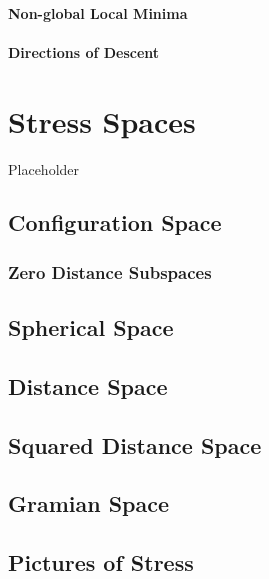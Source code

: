 \documentclass[
  12pt,
]{book}
\begin{document}
\subsubsection{Non-global Local Minima}\label{non-global-local-minima}

\subsubsection{Directions of Descent}\label{directions-of-descent}

\chapter{Stress Spaces}\label{propspaces}

Placeholder

\section{Configuration Space}\label{propconfspace}

\subsection{Zero Distance Subspaces}\label{propzerodist}

\section{Spherical Space}\label{propspherespace}

\section{Distance Space}\label{distance-space}

\section{Squared Distance Space}\label{squared-distance-space}

\section{Gramian Space}\label{gramian-space}

\section{Pictures of Stress}\label{picsstress}
\end{document}
